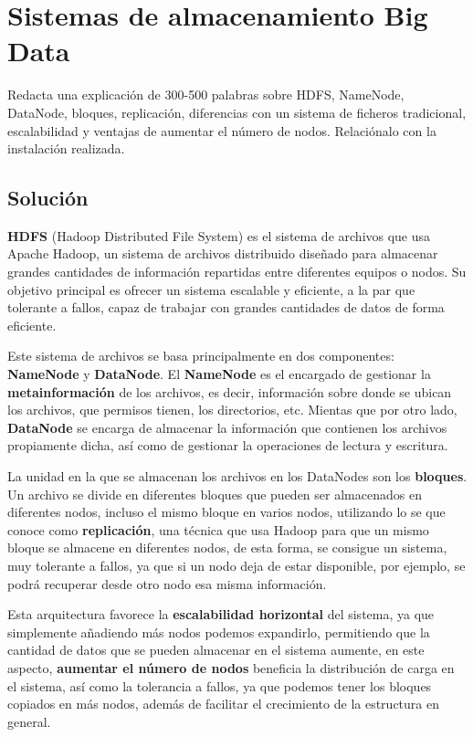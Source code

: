 \section{Sistemas de almacenamiento Big Data}
Redacta una explicación de 300-500 palabras sobre HDFS, NameNode, DataNode, bloques, replicación, diferencias con un sistema de ficheros tradicional, escalabilidad y ventajas de aumentar el número de nodos. Relaciónalo con la instalación realizada.

\subsection{Solución}
\textbf{HDFS} (Hadoop Distributed File System) es el sistema de archivos que usa Apache Hadoop, un sistema de archivos distribuido diseñado para almacenar grandes cantidades de información repartidas entre diferentes equipos o nodos. Su objetivo principal es ofrecer un sistema escalable y eficiente, a la par que tolerante a fallos, capaz de trabajar con grandes cantidades de datos de forma eficiente.

Este sistema de archivos se basa principalmente en dos componentes: \textbf{NameNode} y \textbf{DataNode}. El \textbf{NameNode} es el encargado de gestionar la \textbf{metainformación} de los archivos, es decir, información sobre donde se ubican los archivos, que permisos tienen, los directorios, etc. Mientas que por otro lado, \textbf{DataNode} se encarga de almacenar la información que contienen los archivos propiamente dicha, así como de gestionar la operaciones de lectura y escritura.

La unidad en la que se almacenan los archivos en los DataNodes son los \textbf{bloques}. Un archivo se divide en diferentes bloques que pueden ser almacenados en diferentes nodos, incluso el mismo bloque en varios nodos, utilizando lo se que conoce como \textbf{replicación}, una técnica que usa Hadoop para que un mismo bloque se almacene en diferentes nodos, de esta forma, se consigue un sistema, muy tolerante a fallos, ya que si un nodo deja de estar disponible, por ejemplo, se podrá recuperar desde otro nodo esa misma información. 

Esta arquitectura favorece la \textbf{escalabilidad horizontal} del sistema, ya que simplemente añadiendo más nodos podemos expandirlo, permitiendo que la cantidad de datos que se pueden almacenar en el sistema aumente, en este aspecto, \textbf{aumentar el número de nodos} beneficia la distribución de carga en el sistema, así como la tolerancia a fallos, ya que podemos tener los bloques copiados en más nodos, además de facilitar el crecimiento de la estructura en general. 

